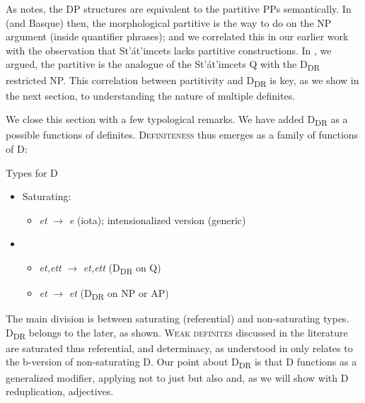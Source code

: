 \documentclass[output=paper,
modfonts
]{langscibook}
\begin{document}
As \citeauthor{matthewson1998} notes, the  DP structures are equivalent to the partitive PPs semantically. In  (and Basque) then, the morphological partitive is the way to do  on the NP argument (inside quantifier phrases); and we correlated this in our earlier work with the observation that St'\'at'imcets lacks partitive constructions. In , we argued, the partitive is the analogue of the St'\'at'imcets Q with the D\textsubscript{DR} restricted NP. This correlation between partitivity and D\textsubscript{DR} is key, as we show in the next section, to understanding the nature of multiple definites. 

We close this section with a few typological remarks. We have added D\textsubscript{DR} as a possible functions of definites. \textsc{Definiteness} thus emerges as a family of functions of D:\largerpage

\ea\label{ex:etxeberria:41}
	{Types for D}
	\begin{itemize}
	\item {Saturating:} 
		\begin{itemize}
			\item \textit{et} $\rightarrow$ \textit{e} (iota); intensionalized version (generic)
		\end{itemize} 
		\item {}
		\begin{itemize}
			\item \textit{et,ett} $\rightarrow$ \textit{et,ett} (D\textsubscript{DR} on Q)
			\item \textit{et} $\rightarrow$ \textit{et} (D\textsubscript{DR} on NP or AP)
		\end{itemize}
	\end{itemize}
\z

The main division is between saturating (referential) and non-saturating types. D\textsubscript{DR} belongs to the later, as shown. \textsc{Weak definites} discussed in the literature are saturated thus referential, and determinacy, as understood in \citet{CoppockBeaver2015} only relates to the b-version of non-saturating D. Our point about D\textsubscript{DR} is that D functions as a generalized modifier, applying not to just  but also  and, as we will show with D reduplication, adjectives. 
\end{document}
